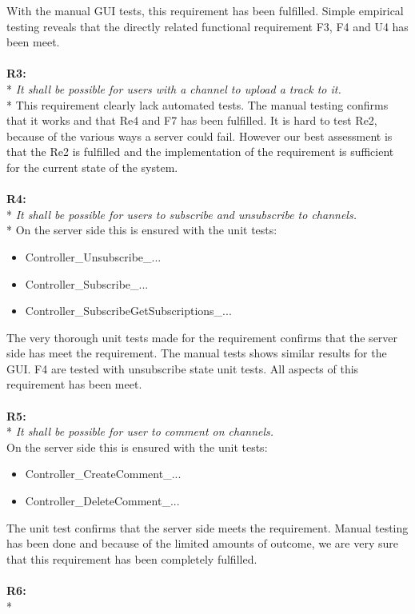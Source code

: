 \documentclass[a4paper,11pt,report]{article}
\begin{document}
With the manual GUI tests, this requirement has been fulfilled. Simple empirical testing reveals that the directly related functional requirement F3, F4 and U4 has been meet. \\ \\
\textbf{R3:} \\*
\textit{It shall be possible for users with a channel to upload a track to it.} \\*
This requirement clearly lack automated tests. The manual testing confirms that it works and that Re4 and F7 has been fulfilled. It is hard to test Re2, because of the various ways a server could fail. However our best assessment is that the Re2 is fulfilled and the implementation of the requirement is sufficient for the current state of the system. \\ \\
\textbf{R4:} \\*
\textit{It shall be possible for users to subscribe and unsubscribe to channels.} \\*
On the server side this is ensured with the unit tests:
\begin{itemize}
\item Controller\_Unsubscribe\_...
\item Controller\_Subscribe\_...
\item Controller\_SubscribeGetSubscriptions\_...
\end{itemize}
The very thorough unit tests made for the requirement confirms that the server side has meet the requirement. The manual tests shows similar results for the GUI. F4 are tested with unsubscribe state unit tests. All aspects of this requirement has been meet. \\ \\
\textbf{R5:} \\*
\textit{It shall be possible for user to comment on channels.} \\
On the server side this is ensured with the unit tests:
\begin{itemize}
\item Controller\_CreateComment\_...
\item Controller\_DeleteComment\_...
\end{itemize}
The unit test confirms that the server side meets the requirement. Manual testing has been done and because of the limited amounts of outcome, we are very sure that this requirement has been completely fulfilled. \\ \\
\textbf{R6:} \\*
\end{document}

